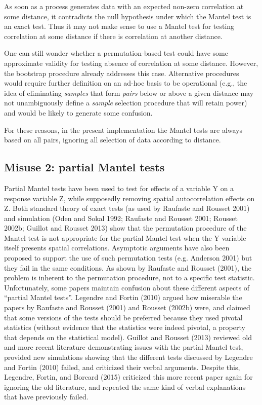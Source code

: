 \documentclass[
  12pt,
]{book}
\begin{document}
As soon as a process generates data with an expected non-zero correlation at some distance, it contradicts the null hypothesis under which the Mantel test is an exact test. Thus it may not make sense to use a Mantel test for testing correlation at some distance if there is correlation at another distance.

One can still wonder whether a permutation-based test could have some approximate validity for testing absence of correlation at some distance. However, the bootstrap procedure already addresses this case. Alternative procedures would require further definition on an ad-hoc basis to be operational (e.g., the idea of eliminating \emph{samples} that form \emph{pairs} below or above a given distance may not unambiguously define a \emph{sample} selection procedure that will retain power) and would be likely to generate some confusion.

For these reasons, in the present implementation the Mantel tests are always based on all pairs, ignoring all selection of data according to distance.

\hypertarget{misuse-2-partial-mantel-tests}{%
\subsection{Misuse 2: partial Mantel tests}\label{misuse-2-partial-mantel-tests}}

Partial Mantel tests have been used to test for effects of a variable Y on a response variable Z, while supposedly removing spatial autocorrelation effects on Z. Both standard theory of exact tests (as used by Raufaste and Rousset 2001) and simulation (Oden and Sokal 1992; Raufaste and Rousset 2001; Rousset 2002b; Guillot and Rousset 2013) show that the permutation procedure of the Mantel test is not appropriate for the partial Mantel test when the Y variable itself presents spatial correlations. Asymptotic arguments have also been proposed to support the use of such permutation tests (e.g. Anderson 2001) but they fail in the same conditions. As shown by Raufaste and Rousset (2001), the problem is inherent to the permutation procedure, not to a specific test statistic. Unfortunately, some papers maintain confusion about these different aspects of ``partial Mantel tests''. Legendre and Fortin (2010) argued how miserable the papers by Raufaste and Rousset (2001) and Rousset (2002b) were, and claimed that some versions of the tests should be preferred because they used pivotal statistics (without evidence that the statistics were indeed pivotal, a property that depends on the statistical model). Guillot and Rousset (2013) reviewed old and more recent literature demonstrating issues with the partial Mantel test, provided new simulations showing that the different tests discussed by Legendre and Fortin (2010) failed, and criticized their verbal arguments. Despite this, Legendre, Fortin, and Borcard (2015) criticized this more recent paper again for ignoring the old literature, and repeated the same kind of verbal explanations that have previously failed.
\end{document}

